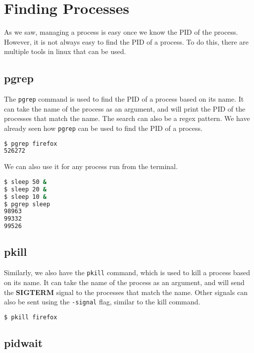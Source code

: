 \vfill
\pagebreak
\section{Finding Processes}

As we saw, managing a process is easy once we know the PID of the process.
However, it is not always easy to find the PID of a process.
To do this, there are multiple tools in linux that can be used.

\subsection{pgrep}

The \texttt{pgrep} command is used to find the PID of a process based on its name.
It can take the name of the process as an argument, and will print the PID of the
processes that match the name. The search can also be a regex pattern.
We have already seen how \texttt{pgrep} can be used to find the PID of a process.

\begin{lstlisting}[language=bash]
$ pgrep firefox
526272
\end{lstlisting}

We can also use it for any process run from the terminal.

\begin{lstlisting}[language=bash]
$ sleep 50 &
$ sleep 20 &
$ sleep 10 &
$ pgrep sleep
98963
99332
99526
\end{lstlisting}

\subsection{pkill}

Similarly, we also have the \texttt{pkill} command, which is used to kill a process
based on its name. It can take the name of the process as an argument, and will
send the \textbf{SIGTERM} signal to the processes that match the name.
Other signals can also be sent using the \texttt{-signal} flag, similar to the
kill command.

\begin{lstlisting}[language=bash]
$ pkill firefox
\end{lstlisting}

\subsection{pidwait}

